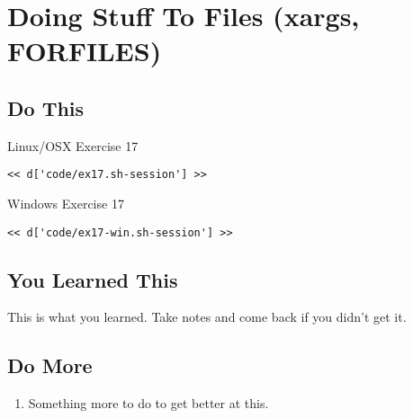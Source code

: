 \chapter{Doing Stuff To Files (xargs, FORFILES)}

\section{Do This}

\begin{code}{Linux/OSX Exercise 17}
\begin{Verbatim}
<< d['code/ex17.sh-session'] >>
\end{Verbatim}
\end{code}

\begin{code}{Windows Exercise 17}
\begin{Verbatim}
<< d['code/ex17-win.sh-session'] >>
\end{Verbatim}
\end{code}

\section{You Learned This}

This is what you learned.  Take notes and come back if you didn't get it.

\section{Do More}

\begin{enumerate}
\item Something more to do to get better at this.
\end{enumerate}

